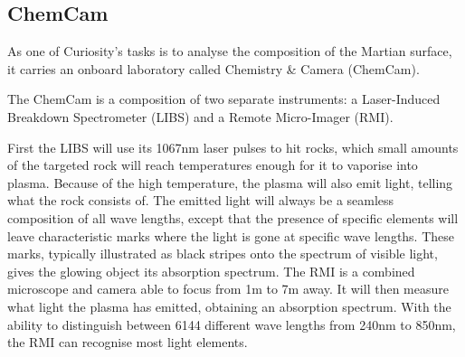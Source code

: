 \subsection{ChemCam}
As one of Curiosity's tasks is to analyse the composition of the Martian surface, it carries an onboard laboratory called Chemistry & Camera (ChemCam).

The ChemCam is a composition of two separate instruments: a Laser-Induced Breakdown Spectrometer (LIBS) and a Remote Micro-Imager (RMI).

First the LIBS will use its 1067nm laser pulses to hit rocks, which small amounts of the targeted rock will reach temperatures enough for it to vaporise into plasma.
Because of the high temperature, the plasma will also emit light, telling what the rock consists of.
The emitted light will always be a seamless composition of all wave lengths, except that the presence of specific elements will leave characteristic marks where the light is gone at specific wave lengths.
These marks, typically illustrated as black stripes onto the spectrum of visible light, gives the glowing object its absorption spectrum.
The RMI is a combined microscope and camera able to focus from 1m to 7m away.
It will then measure what light the plasma has emitted, obtaining an absorption spectrum.
With the ability to distinguish between 6144 different wave lengths from 240nm to 850nm, the RMI can recognise most light elements. \cite{ChemCam}
